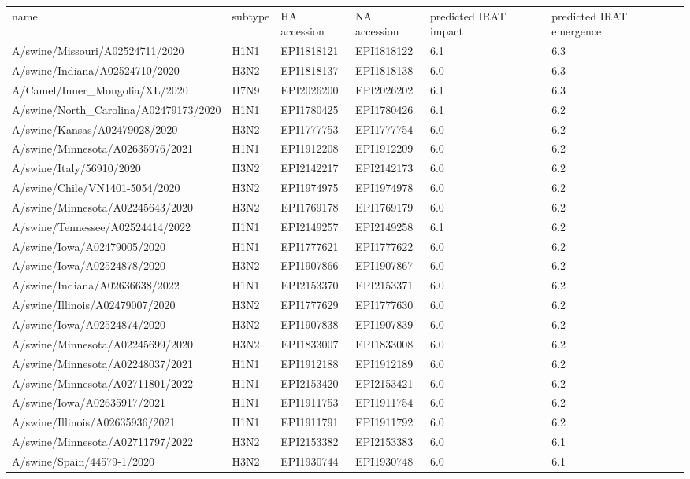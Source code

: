 \begin{tabular}{L{1.2in}|L{.3in}|L{.3in}|L{.3in}|L{.3in}|L{.3in}}\hline
name&subtype& HA  accession & NA  accession & predicted  IRAT  impact & predicted  IRAT  emergence \\
A/swine/Missouri/A02524711/2020&H1N1&EPI1818121&EPI1818122&6.1&6.3\\
A/swine/Indiana/A02524710/2020&H3N2&EPI1818137&EPI1818138&6.0&6.3\\
 A/Camel/Inner\_Mongolia/XL/2020 &H7N9&EPI2026200&EPI2026202&6.1&6.3\\
 A/swine/North\_Carolina/A02479173/2020 &H1N1&EPI1780425&EPI1780426&6.1&6.2\\
A/swine/Kansas/A02479028/2020&H3N2&EPI1777753&EPI1777754&6.0&6.2\\
A/swine/Minnesota/A02635976/2021&H1N1&EPI1912208&EPI1912209&6.0&6.2\\
A/swine/Italy/56910/2020&H3N2&EPI2142217&EPI2142173&6.0&6.2\\
A/swine/Chile/VN1401-5054/2020&H3N2&EPI1974975&EPI1974978&6.0&6.2\\
A/swine/Minnesota/A02245643/2020&H3N2&EPI1769178&EPI1769179&6.0&6.2\\
A/swine/Tennessee/A02524414/2022&H1N1&EPI2149257&EPI2149258&6.1&6.2\\
A/swine/Iowa/A02479005/2020&H1N1&EPI1777621&EPI1777622&6.0&6.2\\
A/swine/Iowa/A02524878/2020&H3N2&EPI1907866&EPI1907867&6.0&6.2\\
A/swine/Indiana/A02636638/2022&H1N1&EPI2153370&EPI2153371&6.0&6.2\\
A/swine/Illinois/A02479007/2020&H3N2&EPI1777629&EPI1777630&6.0&6.2\\
A/swine/Iowa/A02524874/2020&H3N2&EPI1907838&EPI1907839&6.0&6.2\\
A/swine/Minnesota/A02245699/2020&H3N2&EPI1833007&EPI1833008&6.0&6.2\\
A/swine/Minnesota/A02248037/2021&H1N1&EPI1912188&EPI1912189&6.0&6.2\\
A/swine/Minnesota/A02711801/2022&H1N1&EPI2153420&EPI2153421&6.0&6.2\\
A/swine/Iowa/A02635917/2021&H1N1&EPI1911753&EPI1911754&6.0&6.2\\
A/swine/Illinois/A02635936/2021&H1N1&EPI1911791&EPI1911792&6.0&6.2\\
A/swine/Minnesota/A02711797/2022&H3N2&EPI2153382&EPI2153383&6.0&6.1\\
A/swine/Spain/44579-1/2020&H3N2&EPI1930744&EPI1930748&6.0&6.1\\

\end{tabular}
